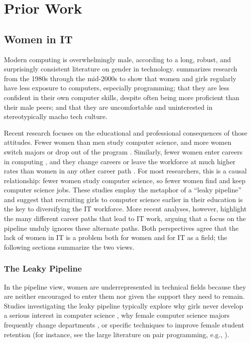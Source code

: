 \section{Prior Work}
\subsection{Women in IT}
Modern computing is overwhelmingly male, according to a long, robust, and surprisingly consistent literature on gender in technology. \citet{Sanders2005Gender} summarizes research from the 1980s through the mid-2000s to show that women and girls regularly have less exposure to computers, especially programming; that they are less confident in their own computer skills, despite often being more proficient than their male peers; and that they are uncomfortable and uninterested in stereotypically macho tech culture.

Recent research focuses on the educational and professional consequences of those attitudes. Fewer women than men study computer science, and more women switch majors or drop out of the program \citep{Cohoon2006Just}. Similarly, fewer women enter careers in computing \citep{BartolAspray2006Transition}, and they change careers or leave the workforce at much higher rates than women in any other career path \citep{GlassEtAl2013Whats}. For most researchers, this is a causal relationship: fewer women study computer science, so fewer women find and keep computer science jobs. These studies employ the metaphor of a ``leaky pipeline'' \citep{Camp1997Incredible} and suggest that recruiting girls to computer science earlier in their education is the key to diversifying the IT workforce. More recent analyses, however, highlight the many different career paths that lead to IT work, arguing that a focus on the pipeline unduly ignores these alternate paths. Both perspectives agree that the lack of women in IT is a problem both for women and for IT as a field; the following sections summarize the two views.

\subsubsection{The Leaky Pipeline}
In the pipeline view, women are underrepresented in technical fields because they are neither encouraged to enter them nor given the support they need to remain. Studies investigating the leaky pipeline typically explore why girls never develop a serious interest in computer science \citep{BarkerEtAl2006Recruiting}, why female computer science majors frequently change departments \citep{KatzEtAl2006Traversing}, or specific techniques to improve female student retention (for instance, see the large literature on pair programming, e.g., \citealp{WernerEtAl2005Want, PorterEtAl2013Success}).

